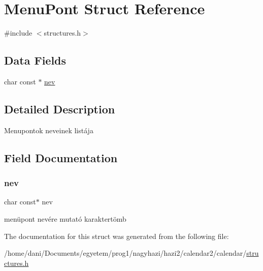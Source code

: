 \hypertarget{struct_menu_pont}{}\section{Menu\+Pont Struct Reference}
\label{struct_menu_pont}


{\ttfamily \#include $<$structures.\+h$>$}

\subsection*{Data Fields}
\begin{DoxyCompactItemize}
\item 
char const  $\ast$ \hyperlink{struct_menu_pont_a21c8b004e3b92cd18b29f8a51717956d}{nev}
\end{DoxyCompactItemize}


\subsection{Detailed Description}
Menupontok neveinek listája 

\subsection{Field Documentation}
\mbox{\label{struct_menu_pont_a21c8b004e3b92cd18b29f8a51717956d}} 
\subsubsection{\texorpdfstring{nev}{nev}}
{\footnotesize\ttfamily char const$\ast$ nev}

menüpont nevére mutató karaktertömb 

The documentation for this struct was generated from the following file\+:\begin{DoxyCompactItemize}
\item 
/home/dani/\+Documents/egyetem/prog1/nagyhazi/hazi2/calendar2/calendar/\hyperlink{structures_8h}{structures.\+h}\end{DoxyCompactItemize}

